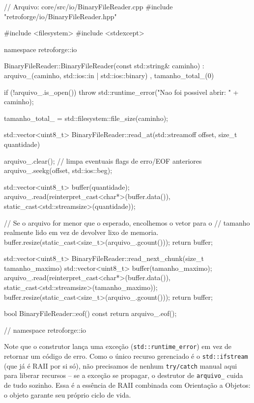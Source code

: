 \begin{CaixaCodigo}
// Arquivo: core/src/io/BinaryFileReader.cpp
#include "retroforge/io/BinaryFileReader.hpp"

#include <filesystem>
#include <stdexcept>

namespace retroforge::io {

BinaryFileReader::BinaryFileReader(const std::string& caminho)
    : arquivo_(caminho, std::ios::in | std::ios::binary)
    , tamanho_total_(0) {

    if (!arquivo_.is_open()) {
        throw std::runtime_error("Nao foi possivel abrir: " + caminho);
    }

    tamanho_total_ = std::filesystem::file_size(caminho);
}

std::vector<uint8_t> BinaryFileReader::read_at(std::streamoff offset, size_t quantidade) {
    arquivo_.clear();               // limpa eventuais flags de erro/EOF anteriores
    arquivo_.seekg(offset, std::ios::beg);

    std::vector<uint8_t> buffer(quantidade);
    arquivo_.read(reinterpret_cast<char*>(buffer.data()), static_cast<std::streamsize>(quantidade));

    // Se o arquivo for menor que o esperado, encolhemos o vetor para o
    // tamanho realmente lido em vez de devolver lixo de memoria.
    buffer.resize(static_cast<size_t>(arquivo_.gcount()));
    return buffer;
}

std::vector<uint8_t> BinaryFileReader::read_next_chunk(size_t tamanho_maximo) {
    std::vector<uint8_t> buffer(tamanho_maximo);
    arquivo_.read(reinterpret_cast<char*>(buffer.data()), static_cast<std::streamsize>(tamanho_maximo));
    buffer.resize(static_cast<size_t>(arquivo_.gcount()));
    return buffer;
}

bool BinaryFileReader::eof() const {
    return arquivo_.eof();
}

} // namespace retroforge::io
\end{CaixaCodigo}

\begin{CaixaInfo}
Note que o construtor lança uma exceção (\texttt{std::runtime\_error}) em vez de retornar um código de erro. Como o único recurso gerenciado é o \texttt{std::ifstream} (que já é RAII por si só), não precisamos de nenhum \texttt{try/catch} manual aqui para liberar recursos -- se a exceção se propagar, o destrutor de \texttt{arquivo\_} cuida de tudo sozinho. Essa é a essência de RAII combinada com Orientação a Objetos: o objeto garante seu próprio ciclo de vida.
\end{CaixaInfo}

